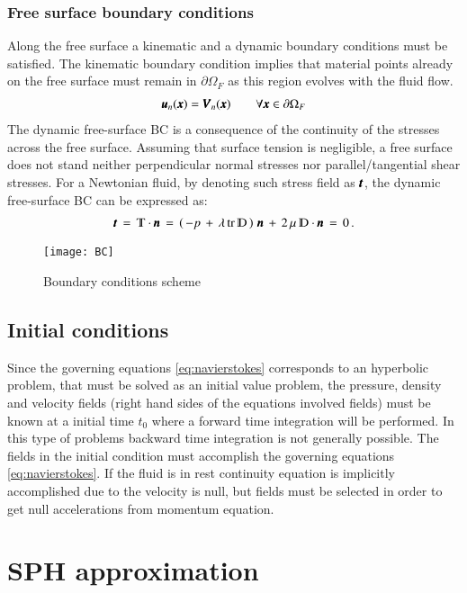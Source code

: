 \subsubsection{Free surface boundary conditions}
%
Along the free surface a kinematic and a dynamic boundary conditions must be satisfied.
The kinematic boundary condition implies that material points already on the free surface
must remain in $\partial \Omega_F$ as this region evolves with the fluid flow.
%
\begin{eqnarray}
\pmb{u}_n(\pmb{x}) = \pmb{V}_n(\pmb{x}) \qquad \forall \pmb{x} \in \partial\Omega_F
\end{eqnarray}
%
The dynamic free-surface BC is a consequence of the continuity of the stresses across
the free surface. Assuming that surface tension is negligible, a free surface does not
stand neither perpendicular normal stresses nor parallel/tangential shear stresses.
For a Newtonian fluid, by denoting such stress field as $\pmb{t}$, 
the dynamic free-surface BC can be expressed as:
%
\begin{eqnarray}
\bs{t} \, = \, \varmathbb{T} \cdot \bs{n} \, = \, \left(\, - p \, + \, 
\lambda \, \textrm{tr}\,  \varmathbb{D} \,\right) \, \bs{n}    \, + \,
2 \, \mu \, \varmathbb{D} \cdot \bs{n} \, = \, 0 \,.
\end{eqnarray}
%
\begin{figure}[!ht]
  \centering
  \texttt{[image: BC]}
  \caption{Boundary conditions scheme}
  \label{fig:aquagpusph:BC}
\end{figure}
%
\subsection{Initial conditions}
%
Since the governing equations \ref{eq:navierstokes} corresponds to an hyperbolic problem,
that must be solved as an initial value problem, the pressure, density and velocity fields
(right hand sides of the equations involved fields) must be known at a initial time $t_0$
where a forward time integration will be performed. In this type of problems backward
time integration is not generally possible.\rc
%
The fields in the initial condition must accomplish the governing equations
\ref{eq:navierstokes}. If the fluid is in rest continuity equation is implicitly
accomplished due to the velocity is null, but fields must be selected in order to get null
accelerations from momentum equation.
%
\section{SPH approximation}
\label{ss:sph_description}
%
